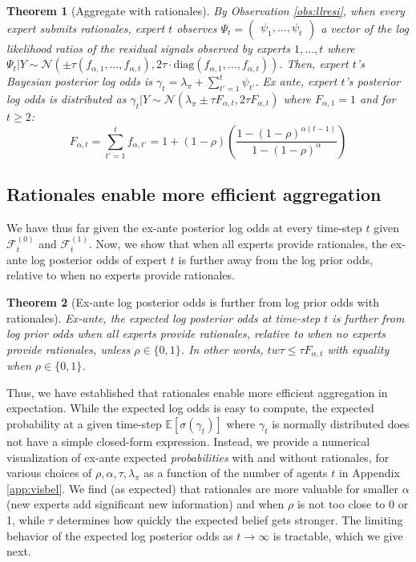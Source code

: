 \documentclass{winnower}
\newtheorem{theorem}{Theorem}
\begin{document}
\begin{theorem}[Aggregate with rationales]\label{thm:aggwith}
By Observation \ref{obs:llresi}, when every expert submits rationales, expert $t$ observes $\Psi_{t} = \begin{pmatrix} {\psi}_1, \ldots, {\psi}_{t} \end{pmatrix}$ a vector of the log likelihood ratios of the residual signals observed by experts $1, \ldots, t$ where $\Psi_{t}|Y \sim \mathcal{N}\left(\pm \tau \left(f_{\alpha, 1}, \ldots, f_{\alpha, t}\right), 2\tau \cdot \text{diag}\left(f_{\alpha, 1}, \ldots, f_{\alpha, t}\right)\right)$. Then, expert $t$'s Bayesian posterior log odds is $\gamma_t = \lambda_\pi + \sum_{t'=1}^t \psi_{t'}$. Ex ante, expert $t$'s posterior log odds is distributed as $\gamma_t|Y \sim \mathcal{N}\left(\lambda_\pi \pm \tau F_{\alpha,t}, 2\tau F_{\alpha,t}\right)$ where $F_{\alpha, 1}=1$ and for $t\geq 2$:
{\small
\begin{equation}
F_{\alpha,t} = \sum_{t'=1}^t f_{\alpha,t'} = 1 + (1-\rho)\left(\frac{1-(1-\rho)^{\alpha(t-1)}}{1-(1-\rho)^\alpha}\right)
\end{equation}
}
\end{theorem}


\subsection{Rationales enable more efficient aggregation}

We have thus far given the ex-ante posterior log odds at every time-step $t$ given $\mathcal{F}_t^{(0)}$ and $\mathcal{F}_t^{(1)}$. Now, we show that when all experts provide rationales, the ex-ante log posterior odds of expert $t$ is further away from the log prior odds, relative to when no experts provide rationales.

\begin{theorem}[Ex-ante log posterior odds is further from log prior odds with rationales]\label{thm:eff}
    Ex-ante, the expected log posterior odds at time-step $t$ is further from log prior odds when all experts provide rationales, relative to when no experts provide rationales, unless $\rho \in \{0, 1\}$. In other words, $tw\tau \leq \tau F_{\alpha, t}$ with equality when $\rho \in \{0, 1\}$.
\end{theorem}


Thus, we have established that rationales enable more efficient aggregation in expectation. While the expected log odds is easy to compute, the expected probability at a given time-step $\mathbb{E}[\sigma(\gamma_t)]$ where $\gamma_t$ is normally distributed does not have a simple closed-form expression. Instead, we provide a numerical visualization of ex-ante expected \emph{probabilities} with and without rationales, for various choices of $\rho, \alpha, \tau, \lambda_\pi$ as a function of the number of agents $t$ in Appendix \ref{app:visbel}. We find (as expected) that rationales are more valuable for smaller $\alpha$ (new experts add significant new information) and when $\rho$ is not too close to 0 or 1, while $\tau$ determines how quickly the expected belief gets stronger. The limiting behavior of the expected log posterior odds as $t \to \infty$ is tractable, which we give next. 
\end{document}
